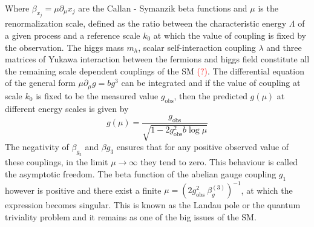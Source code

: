 \documentclass[11pt, a4paper]{article}
\newcommand{\jhkbf}[1]{\textbf{\color{red} [#1]}}
\begin{document}
Where $\beta_{x_j} = \mu \partial_\mu x_j$ are the Callan - Symanzik beta functions and $\mu$ is the renormalization scale, defined as the ratio between the characteristic energy $\Lambda$ of a given process and a reference scale $k_0$ at which the value of coupling is fixed by the observation.
The higgs mass $m_h$, scalar self-interaction coupling $\lambda$ and three matrices of Yukawa interaction between the fermions and higgs field constitute all the remaining scale dependent couplings of the SM \textcolor{red}{(?)}.
The differential equation of the general form $\mu \partial_\mu g = b g^3$ can be integrated and if the value of coupling at scale $k_0$ is fixed to be the measured value $g_{\text{obs}}$, then the predicted $g(\mu)$ at different energy scales is given by
\begin{equation}
    g(\mu) = \frac{g_{\text{obs}}}{\sqrt{1-2g_{\text{obs}}^2 b \log{\mu}}}
\end{equation}
The negativity of $\beta_{g_2}$ and $\beta{g_3}$ ensures that for any positive observed value of these couplings, in the limit $\mu \rightarrow \infty$ they tend to zero. This behaviour is called the asymptotic freedom.
The beta function of the abelian gauge coupling $g_1$ however is positive and
there exist a finite $\mu= \left(2 g_{\text{obs}}^2 \ \beta_{g}^{(3)} \right)^{-1} $, at which the expression becomes singular.
This is known as the Landau pole or the quantum triviality problem and
it remains as one of the big issues of the SM.


\end{document}
